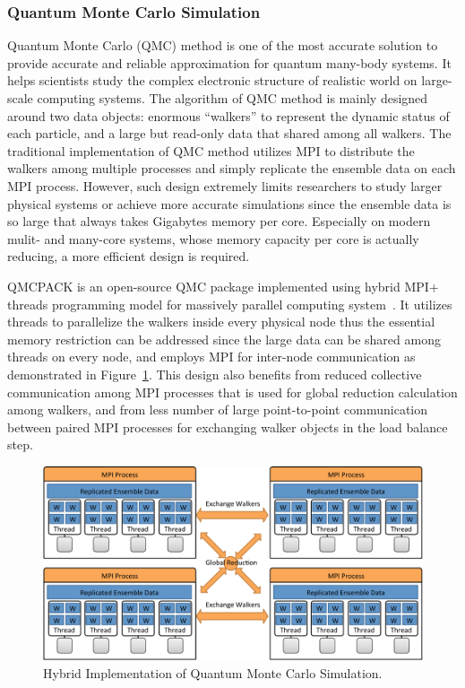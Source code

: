 \subsubsection{Quantum Monte Carlo Simulation}
Quantum Monte Carlo (QMC) method is one of the most accurate solution to
provide accurate and reliable approximation for quantum many-body systems.
It helps scientists study the complex electronic structure of realistic
world on large-scale computing systems. The algorithm of QMC method is
mainly designed around two data objects: enormous ``walkers'' to represent
the dynamic status of each particle, and a large but read-only 
data that shared among all walkers. The traditional implementation of
QMC method utilizes MPI to distribute the walkers among multiple processes
and simply replicate the ensemble data on each MPI process. However,
such design extremely limits researchers to study larger physical systems
or achieve more accurate simulations since the ensemble data is so large
that always takes Gigabytes memory per core. Especially on modern
mulit- and many-core systems, whose memory capacity per core is actually
reducing, a more efficient design is required.

QMCPACK is an open-source QMC package implemented using hybrid MPI+
threads programming model for massively parallel computing system~\cite{qmcpack}.
It utilizes threads to parallelize the walkers inside every physical node
thus the essential memory restriction can be addressed since the large
 data can be shared among threads on every node, and employs MPI
for inter-node communication as demonstrated in Figure~\ref{fig:app-qmcpack}.
This design also benefits from reduced collective communication among
MPI processes that is used for global reduction calculation among walkers,
and from less number of large point-to-point communication between paired
MPI processes for exchanging walker objects in the load balance step.

\begin{figure}[ht]
\centering
\includegraphics[width=1\textwidth]{figures/background/app-qmcpack.pdf}
\caption{Hybrid Implementation of Quantum Monte Carlo Simulation.}
\label{fig:app-qmcpack}
\end{figure}

